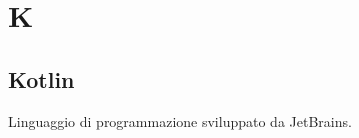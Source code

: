 \section{K}
     \subsection{Kotlin}
          Linguaggio di programmazione sviluppato da JetBrains.
\newpage